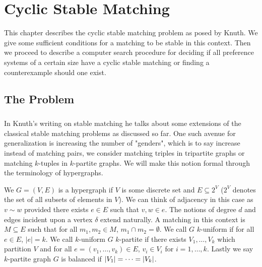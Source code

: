 \chapter{Cyclic Stable Matching}
This chapter describes the cyclic stable matching problem as posed by Knuth. We give some sufficient conditions for a matching to be stable in this context. Then we proceed to describe a computer search procedure for deciding if all preference systems of a certain size have a cyclic stable matching or finding a counterexample should one exist. 
\section{The Problem}
\paragraph{}
In Knuth's writing on stable matching \cite{knuth1997stable} he talks about some extensions of the classical stable matching problems as discussed so far. One such avenue for generalization is increasing the number of "genders", which is to say increase instead of matching pairs, we consider matching triples in tripartite graphs or matching $k$-tuples in $k$-partite graphs. We will make this notion formal through the terminology of hypergraphs.
\begin{definition}
We $G=(V,E)$ is a hypergraph if $V$ is some discrete set and $E \subseteq 2^V$ ($2^V$ denotes the set of all subsets of elements in $V$). We can think of adjacency in this case as $v \sim w$ provided there exists $e \in E$ such that $v, w \in e$. The notions of degree $d$ and edges incident upon a vertex $\delta$ extend naturally. A matching in this context is $M \subseteq E$ such that for all $m_1, m_2 \in M$, $m_1 \cap m_2 = \emptyset$. We call $G$ $k$-uniform if for all $e \in E$, $|e| = k$. We call $k$-uniform $G$ $k$-partite if there exists $V_1, \dots, V_k$ which partition $V$ and for all $e=(v_1, \dots, v_k) \in E$, $v_i \in V_i$ for $i = 1,\dots, k$. Lastly we say $k$-partite graph $G$ is balanced if $\left|V_1\right| = \dots = \left|V_k\right|$.
\end{definition}
